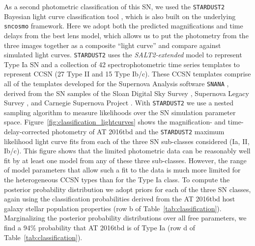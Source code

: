 \documentclass[12pt]{article}
\def\SNABC{AT 2016tbd\xspace}
\begin{document}
{As a second photometric classification of this SN, we used the {\tt STARDUST2} Bayesian light curve classification tool \cite{rodney_type_2014}, which is also built on the underlying {\tt sncosmo} framework. Here we adopt both the predicted magnifications and time delays from the best lens model, which allows us to put the photometry from the three images together as a composite ``light curve'' and compare against simulated light curves.  {\tt STARDUST2} uses the {\it SALT2-extended} model to represent Type Ia SN \cite{guy_salt2:_2007, pierel_extending_2018} and a collection of 42  spectrophotometric time series templates to represent CCSN (27 Type II and 15 Type Ib/c).  These CCSN templates comprise all of the templates developed for the Supernova Analysis software {\tt SNANA} \cite{kessler_snana:_2009}, derived from the SN samples of the Sloan Digital Sky Survey \cite{frieman_sloan_2008,sako_sloan_2008, dandrea_type_2010}, Supernova Legacy Survey \cite{astier_supernova_2006}, and Carnegie Supernova Project \cite{hamuy_carnegie_2006, stritzinger_he-rich_2009, morrell_carnegie_2012}.  With {\tt STARDUST2} we use a nested sampling algorithm to measure likelihoods over the SN simulation parameter space.  
Figure~\ref{fig:classification_lightcurves} shows the magnification- and time-delay-corrected photometry of \SNABC and the {\tt STARDUST2} maximum likelihood light curve fits from each of the three SN sub-classes considered (Ia, II, Ib/c).
This figure shows that the limited photometric data can be reasonably well fit by at least one model from any of these three sub-classes. However, the range of model parameters that allow such a fit to the data is much more limited for the heterogeneous CCSN types than for the Type Ia class.   
To compute the posterior probability distribution we adopt priors for each of the three SN classes, again using the classification probabilities derived from the \SNABC host galaxy stellar population properties (row b of Table~\ref{tab:classification}). 
Marginalizing the posterior  probability distributions over all free parameters, we find a 94\% probability that \SNABC is of Type Ia (row d of Table~\ref{tab:classification}).  




}
\end{document}
